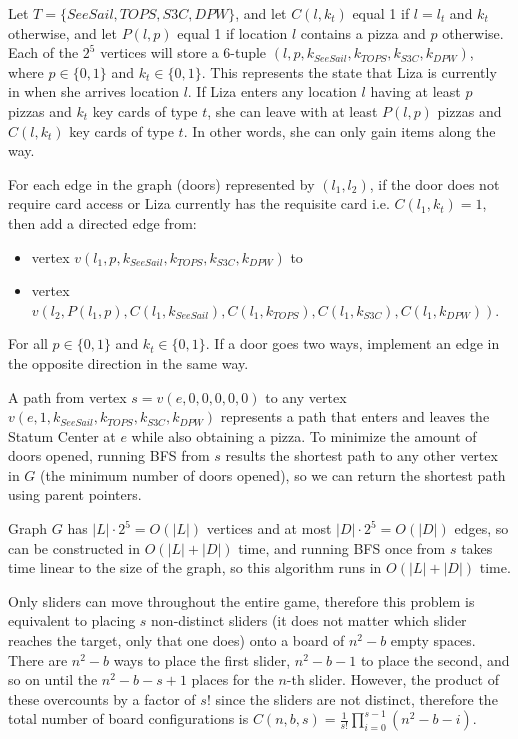 \documentclass[12pt,twoside]{article}
\begin{document}
\begin{problems}
Let $T=\{SeeSail, TOPS, S3C, DPW\}$, and let $C(l,k_t)$ equal 1 if $l=l_t$ and $k_t$ otherwise, and let $P(l,p)$ equal 1 if location $l$ contains a pizza and $p$ otherwise. Each of the $2^5$ vertices will store a 6-tuple $(l, p, k_{SeeSail}, k_{TOPS}, k_{S3C}, k_{DPW})$, where $p \in \{0,1\}$ and $k_t \in \{0,1\}$. This represents the state that Liza is currently in when she arrives location $l$. If Liza enters any location $l$ having at least $p$ pizzas and $k_t$ key cards of type $t$, she can leave with at least $P(l,p)$ pizzas and $C(l,k_t)$ key cards of type $t$. In other words, she can only gain items along the way.

For each edge in the graph (doors) represented by $(l_1,l_2)$, if the door does not require card access or Liza currently has the requisite card i.e. $C(l_1, k_t)=1$, then add a directed edge from:
\begin{itemize}
    \item vertex $v(l_1, p, k_{SeeSail}, k_{TOPS}, k_{S3C}, k_{DPW})$ to
    \item vertex $v(l_2, P(l_1,p), C(l_1,k_{SeeSail}), C(l_1, k_{TOPS}), C(l_1, k_{S3C}), C(l_1, k_{DPW}))$.
\end{itemize}
For all $p \in \{0,1\}$ and $k_t \in \{0,1\}$. If a door goes two ways, implement an edge in the opposite direction in the same way.

A path from vertex $s=v(e,0,0,0,0,0)$ to any vertex $v(e, 1, k_{SeeSail}, k_{TOPS}, k_{S3C}, k_{DPW})$ represents a path that enters and leaves the Statum Center at $e$ while also obtaining a pizza. To minimize the amount of doors opened, running BFS from $s$ results the shortest path to any other vertex in $G$ (the minimum number of doors opened), so we can return the shortest path using parent pointers.

Graph $G$ has $|L|\cdot2^5=O(|L|)$ vertices and at most $|D|\cdot2^5=O(|D|)$ edges, so can be constructed in $O(|L|+|D|)$ time, and running BFS once from $s$ takes time linear to the size of the graph, so this algorithm runs in $O(|L|+|D|)$ time.

\newpage
\problem  %

\begin{problemparts}
\problempart %
Only sliders can move throughout the entire game, therefore this problem is equivalent to placing $s$ non-distinct sliders (it does not matter which slider reaches the target, only that one does) onto a board of $n^2-b$ empty spaces. There are $n^2-b$ ways to place the first slider, $n^2-b-1$ to place the second, and so on until the $n^2-b-s+1$ places for the $n$-th slider. However, the product of these overcounts by a factor of $s!$ since the sliders are not distinct, therefore the total number of board configurations is $C(n,b,s)=\frac{1}{s!}\prod_{i=0}^{s-1}(n^2-b-i)$.


\end{problemparts}
\end{problems}
\end{document}
